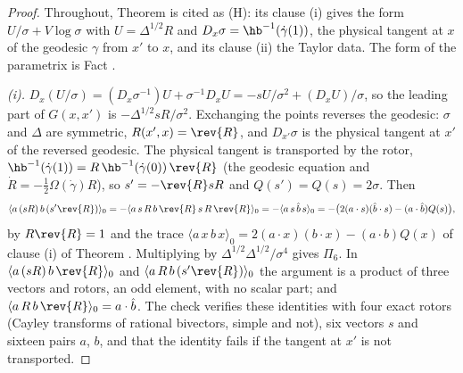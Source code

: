 \begin{proof}
Throughout, Theorem  is cited as (H): its clause (i) gives the form $U/\sigma + V\log\sigma$ with $U = \Delta^{1/2}R$ and $D_{x}\sigma = \hb^{-1}(\dot\gamma(1))$, the physical tangent at $x$ of the geodesic $\gamma$ from $x'$ to $x$, and its clause (ii) the Taylor data. The form of the parametrix is Fact .

\emph{(i).} $D_{x}(U/\sigma) = (D_{x}\sigma^{-1})U + \sigma^{-1}D_{x}U = -sU/\sigma^{2} + (D_{x}U)/\sigma$, so the leading part of $G(x, x')$ is $-\Delta^{1/2}sR/\sigma^{2}$. Exchanging the points reverses the geodesic: $\sigma$ and $\Delta$ are symmetric, $R(x', x) = \rev{R}$, and $D_{x'}\sigma$ is the physical tangent at $x'$ of the reversed geodesic. The physical tangent is transported by the rotor, $\hb^{-1}(\dot\gamma(1)) = R\,\hb^{-1}(\dot\gamma(0))\,\rev{R}$ (the geodesic equation and $\dot R = -\tfrac12\Omega(\dot\gamma)R$), so $s' = -\rev{R}sR$ and $Q(s') = Q(s) = 2\sigma$. Then
\[
\langle a\,(sR)\,b\,(s'\rev{R})\rangle_{0} = -\langle a\,s\,R\,b\,\rev{R}\,s\,R\,\rev{R}\rangle_{0} = -\langle a\,s\,\hat b\,s\rangle_{0} = -\bigl(2(a\cdot s)(\hat b\cdot s) - (a\cdot\hat b)Q(s)\bigr),
\]
by $R\rev{R} = 1$ and the trace $\langle a\,x\,b\,x\rangle_{0} = 2(a\cdot x)(b\cdot x) - (a\cdot b)Q(x)$ of clause (i) of Theorem . Multiplying by $\Delta^{1/2}\Delta^{1/2}/\sigma^{4}$ gives $\Pi_{6}$. In $\langle a\,(sR)\,b\,\rev{R}\rangle_{0}$ and $\langle a\,R\,b\,(s'\rev{R})\rangle_{0}$ the argument is a product of three vectors and rotors, an odd element, with no scalar part; and $\langle a\,R\,b\,\rev{R}\rangle_{0} = a\cdot\hat b$. The check verifies these identities with four exact rotors (Cayley transforms of rational bivectors, simple and not), six vectors $s$ and sixteen pairs $a$, $b$, and that the identity fails if the tangent at $x'$ is not transported.


\end{proof}
